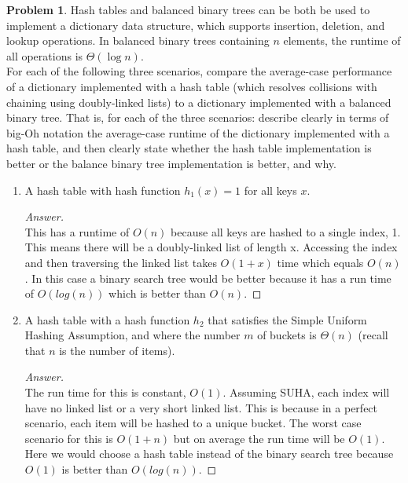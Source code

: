 \documentclass[11pt]{article}
\theoremstyle{definition}
\theoremstyle{definition}
\newtheorem{required}{Problem}
\theoremstyle{definition}
\begin{document}
\begin{required} \label{Hash3}
Hash tables and balanced binary trees can be both be used to implement a dictionary data structure, which supports insertion, deletion, and lookup operations. In balanced binary trees containing $n$ elements, the runtime of all operations is $\Theta(\log n)$.  \\

\noindent For each of the following three scenarios, compare the average-case performance of a dictionary implemented with a hash table (which resolves collisions with chaining using doubly-linked lists) to a dictionary implemented with a balanced binary tree. That is, for each of the three scenarios: describe clearly in terms of big-Oh notation the average-case runtime of the dictionary implemented with a hash table, and then clearly state whether the hash table implementation is better or the balance binary tree implementation is better, and why.
	
\begin{enumerate}[label=(\alph*)]
\item A hash table with hash function $h_1(x)=1$ for all keys $x$.

\begin{proof}[Answer] $ $\\
This has a runtime of $O(n)$ because all keys are hashed to a single index, 1. This means there will be a doubly-linked list of length x. Accessing the index and then traversing the linked list takes $O(1+x)$ time which equals $O(n)$. In this case a binary search tree would be better because it has a run time of $O(log(n))$ which is better than $O(n)$. 
\end{proof}


\vskip 15pt
\item A hash table with a hash function $h_2$ that satisfies the Simple Uniform Hashing Assumption, and where the number $m$ of buckets is $\Theta(n)$ (recall that $n$ is the number of items).
\begin{proof}[Answer] $ $\\
The run time for this is constant, $O(1)$. Assuming SUHA, each index will have no linked list or a very short linked list. This is because in a perfect scenario, each item will be hashed to a unique bucket. The worst case scenario for this is $O(1+n)$ but on average the run time will be $O(1)$. Here we would choose a hash table instead of the binary search tree because $O(1)$ is better than $O(log(n))$. 
\end{proof}



\end{enumerate}
\end{required}
\end{document}
